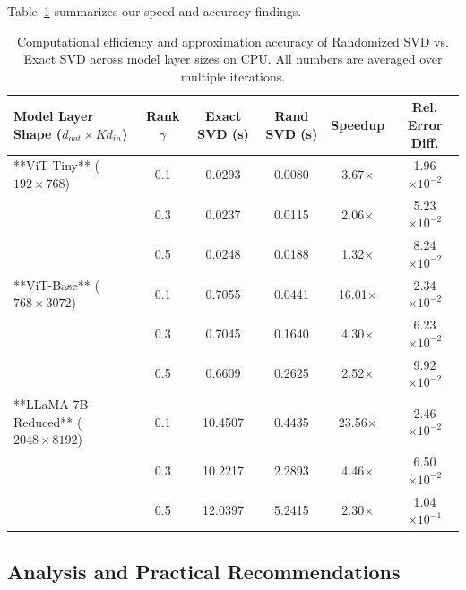 \documentclass{article}
\theoremstyle{plain}
\theoremstyle{definition}
\theoremstyle{remark}
\begin{document}
Table~\ref{tab:svd_benchmarks} summarizes our speed and accuracy findings.

\begin{table}[h]
\caption{Computational efficiency and approximation accuracy of Randomized SVD vs. Exact SVD across model layer sizes on CPU. All numbers are averaged over multiple iterations.}
\label{tab:svd_benchmarks}
\vskip 0.15in
\begin{center}
\begin{small}
\begin{sc}
\begin{tabular}{lccccc}
\toprule
Model Layer Shape ($d_{out} \times K d_{in}$) & Rank $\gamma$ & Exact SVD (s) & Rand SVD (s) & Speedup & Rel. Error Diff. \\
\midrule
**ViT-Tiny** ($192 \times 768$) & 0.1 & 0.0293 & 0.0080 & 3.67$\times$ & 1.96$\times 10^{-2}$ \\
                                & 0.3 & 0.0237 & 0.0115 & 2.06$\times$ & 5.23$\times 10^{-2}$ \\
                                & 0.5 & 0.0248 & 0.0188 & 1.32$\times$ & 8.24$\times 10^{-2}$ \\
\midrule
**ViT-Base** ($768 \times 3072$) & 0.1 & 0.7055 & 0.0441 & 16.01$\times$ & 2.34$\times 10^{-2}$ \\
                                 & 0.3 & 0.7045 & 0.1640 & 4.30$\times$ & 6.23$\times 10^{-2}$ \\
                                 & 0.5 & 0.6609 & 0.2625 & 2.52$\times$ & 9.92$\times 10^{-2}$ \\
\midrule
**LLaMA-7B Reduced** ($2048 \times 8192$) & 0.1 & 10.4507 & 0.4435 & 23.56$\times$ & 2.46$\times 10^{-2}$ \\
                                          & 0.3 & 10.2217 & 2.2893 & 4.46$\times$ & 6.50$\times 10^{-2}$ \\
                                          & 0.5 & 12.0397 & 5.2415 & 2.30$\times$ & 1.04$\times 10^{-1}$ \\
\bottomrule
\end{tabular}
\end{sc}
\end{small}
\end{center}
\vskip -0.1in
\end{table}

\subsection{Analysis and Practical Recommendations}
\end{document}
